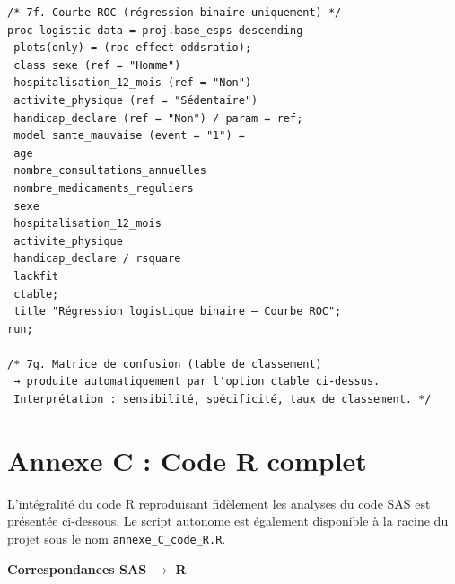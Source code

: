 \documentclass[11pt,a4paper]{memoirerecherche}
\begin{document}
\begin{footnotesize}
\begin{verbatim}
/* 7f. Courbe ROC (régression binaire uniquement) */
proc logistic data = proj.base_esps descending
 plots(only) = (roc effect oddsratio);
 class sexe (ref = "Homme")
 hospitalisation_12_mois (ref = "Non")
 activite_physique (ref = "Sédentaire")
 handicap_declare (ref = "Non") / param = ref;
 model sante_mauvaise (event = "1") =
 age
 nombre_consultations_annuelles
 nombre_medicaments_reguliers
 sexe
 hospitalisation_12_mois
 activite_physique
 handicap_declare / rsquare
 lackfit
 ctable;
 title "Régression logistique binaire — Courbe ROC";
run;

/* 7g. Matrice de confusion (table de classement)
 → produite automatiquement par l'option ctable ci-dessus.
 Interprétation : sensibilité, spécificité, taux de classement. */
\end{verbatim}
\end{footnotesize}

\newpage

\hypertarget{annexe-c-code-r-complet}{%
\section*{Annexe C : Code R complet}\label{annexe-c-code-r-complet}}

L'intégralité du code R reproduisant fidèlement les analyses du code SAS est présentée ci-dessous.
Le script autonome est également disponible à la racine du projet sous le nom \texttt{annexe\_C\_code\_R.R}.

\medskip

\noindent\textbf{Correspondances SAS $\rightarrow$ R}
\end{document}
